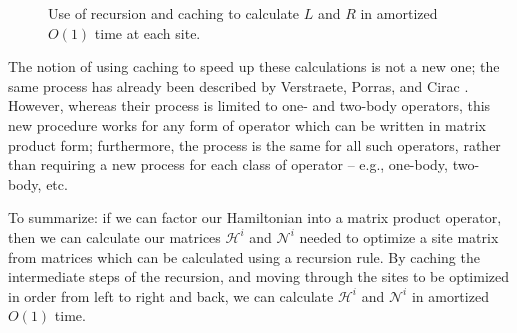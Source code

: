 \documentclass[12pt]{amsbook}
\theoremstyle{plain}
\theoremstyle{definition}
\theoremstyle{remark}
\begin{document}
\begin{figure}
\caption{Use of recursion and caching to calculate $L$ and $R$ in amortized $O(1)$ time at each site. \label{fig:recursive-LR} }
\end{figure}

The notion of using caching to speed up these calculations is not a new one;  the same process has already been described by Verstraete, Porras, and Cirac \cite{cond-mat/0404706}.  However, whereas their process is limited to one- and two-body operators, this new procedure works for any form of operator which can be written in matrix product form;  furthermore, the process is the same for all such operators, rather than requiring a new process for each class of operator -- e.g., one-body, two-body, etc.

To summarize: if we can factor our Hamiltonian into a matrix product operator, then we can calculate our matrices $\mathscr{H}^i$ and $\mathscr{N}^i$ needed to optimize a site matrix from matrices which can be calculated using a recursion rule.  By caching the intermediate steps of the recursion, and moving through the sites to be optimized in order from left to right and back, we can calculate $\mathscr{H}^i$ and $\mathscr{N}^i$ in amortized $O(1)$ time.
\end{document}
